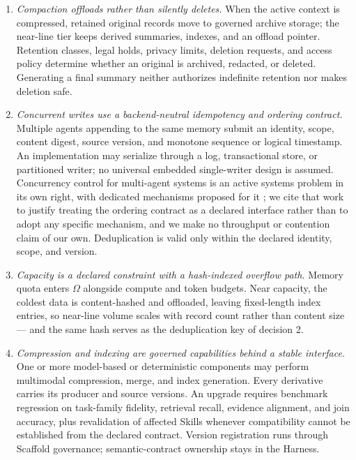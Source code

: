 \documentclass[11pt]{article}
\begin{document}
\begin{enumerate}
\item \textit{Compaction offloads rather than silently deletes.} When the active context is compressed, retained original records move to governed archive storage; the near-line tier keeps derived summaries, indexes, and an offload pointer. Retention classes, legal holds, privacy limits, deletion requests, and access policy determine whether an original is archived, redacted, or deleted. Generating a final summary neither authorizes indefinite retention nor makes deletion safe.
\item \textit{Concurrent writes use a backend-neutral idempotency and ordering contract.} Multiple agents appending to the same memory submit an identity, scope, content digest, source version, and monotone sequence or logical timestamp. An implementation may serialize through a log, transactional store, or partitioned writer; no universal embedded single-writer design is assumed. Concurrency control for multi-agent systems is an active systems problem in its own right, with dedicated mechanisms proposed for it \cite{lyu2026coagent}; we cite that work to justify treating the ordering contract as a declared interface rather than to adopt any specific mechanism, and we make no throughput or contention claim of our own. Deduplication is valid only within the declared identity, scope, and version.
\item \textit{Capacity is a declared constraint with a hash-indexed overflow path.} Memory quota enters $\Omega$ alongside compute and token budgets. Near capacity, the coldest data is content-hashed and offloaded, leaving fixed-length index entries, so near-line volume scales with record count rather than content size --- and the same hash serves as the deduplication key of decision 2.
\item \textit{Compression and indexing are governed capabilities behind a stable interface.} One or more model-based or deterministic components may perform multimodal compression, merge, and index generation. Every derivative carries its producer and source versions. An upgrade requires benchmark regression on task-family fidelity, retrieval recall, evidence alignment, and join accuracy, plus revalidation of affected Skills whenever compatibility cannot be established from the declared contract. Version registration runs through Scaffold governance; semantic-contract ownership stays in the Harness.
\end{enumerate}
\end{document}
